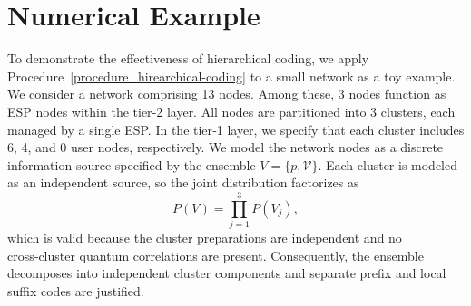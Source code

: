 \documentclass[conference]{IEEEtran}
\begin{document}
\section{Numerical Example} \label{numerical_example}
To demonstrate the effectiveness of hierarchical coding, we apply Procedure~\ref{procedure_hirearchical-coding} to a small network as a toy example. We consider a network comprising 13 nodes. Among these, 3 nodes function as ESP nodes within the tier‑2 layer. All nodes are partitioned into 3 clusters, each managed by a single ESP. In the tier‑1 layer, we specify that each cluster includes 6, 4, and 0 user nodes, respectively. We model the network nodes as a discrete information source specified by the ensemble \(V=\{p,\mathcal V\}\). Each cluster is modeled as an independent source, so the joint distribution factorizes as
\[
P(V)=\prod_{j=1}^{3}P(V_j),
\]
which is valid because the cluster preparations are independent and no cross‑cluster quantum correlations are present. Consequently, the ensemble decomposes into independent cluster components and separate prefix and local suffix codes are justified.
\end{document}
